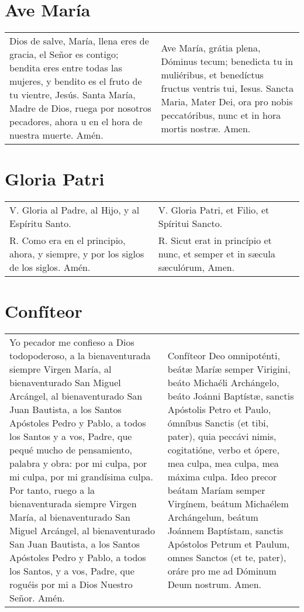 \documentclass[11pt,a4paper]{book}
\begin{document}
    \section*{Ave María}\label{sec:avemaria}
    \begin{longtable} { p{} p{} }
        Dios de salve, María, llena eres de gracia, el Señor es contigo; bendita eres entre todas las mujeres, 
        y bendito es el fruto de tu vientre, Jesús. Santa María, Madre de Dios, ruega por nosotros pecadores, 
        ahora u en el hora de nuestra muerte. Amén.
        
        &
        
        Ave María, grátia plena, Dóminus tecum; benedicta tu in muliéribus, et benedíctus fructus ventris tui, 
        Iesus. Sancta Maria, Mater Dei, ora pro nobis peccatóribus, nunc et in hora mortis nostræ. Amen.
    \end{longtable}

    \section*{Gloria Patri}\label{sec_gloria}
    \begin{longtable} { p{} p{} }
        V. Gloria al Padre, al Hijo, y al Espíritu Santo. &
        V. Gloria Patri, et Filio, et Spíritui Sancto.\\
        
        R. Como era en el principio, ahora, y siempre, y por los siglos de los siglos. Amén. &
        R. Sicut erat in princípio et nunc, et semper et in sæcula sæculórum, Amen.
    \end{longtable}

    \section*{Confíteor}\label{sec:confiteor}
    \begin{longtable} { p{} p{} }
        Yo pecador me confieso a Dios todopoderoso, a la bienaventurada siempre Virgen María, al bienaventurado San Miguel Arcángel, 
        al bienaventurado San Juan Bautista, a los Santos Apóstoles Pedro y Pablo, a todos los Santos y a vos, Padre, que pequé mucho 
        de pensamiento, palabra y obra: por mi culpa, por mi culpa, por mi grandísima culpa. Por tanto, ruego a la bienaventurada 
        siempre Virgen María, al bienaventurado San Miguel Arcángel, al bienaventurado San Juan Bautista, a los Santos Apóstoles 
        Pedro y Pablo, a todos los Santos, y a vos, Padre, que roguéis por mi a Dios Nuestro Señor. Amén. 
        &
        Confíteor Deo omnipoténti, beátæ Maríæ semper Virigini, beáto Michaéli Archángelo, beáto Joánni Baptístæ, sanctis Apóstolis Petro et Paulo, 
        ómníbus Sanctis (et tibi, pater), quia peccávi nimis, cogitatióne, verbo et ópere, mea culpa, mea culpa, mea máxima culpa. Ideo precor beátam 
        Maríam semper Virgínem, beátum Michaélem Archángelum, beátum Joánnem Baptístam, sanctis Apóstolos Petrum et Paulum, omnes Sanctos (et te, pater), 
        oráre pro me ad Dóminum Deum nostrum. Amen.
    \end{longtable}
\end{document}
